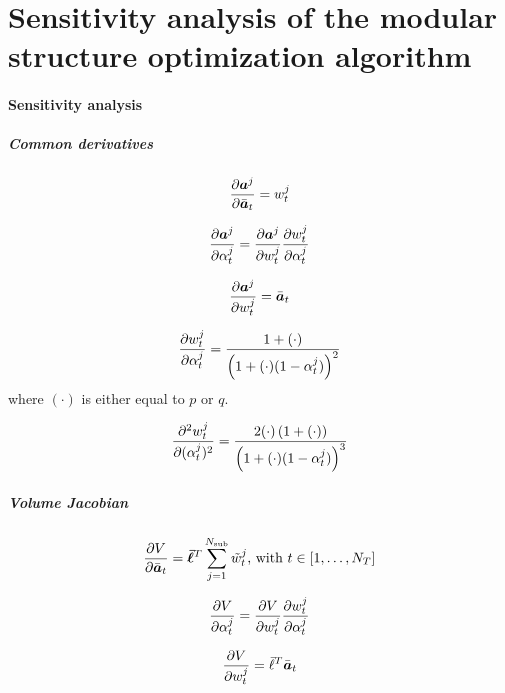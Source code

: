 \chapter{Sensitivity analysis of the modular structure optimization algorithm}
\subsubsection{Sensitivity analysis}
\paragraph*{Common derivatives}

\begin{equation}
    \frac{\partial\bm{a}^j}{\partial\bar{\bm{a}}_t} = w_t^j
\end{equation}


\begin{equation}
    \frac{\partial\bm{a}^j}{\partial\alpha_t^j} =  \frac{\partial\bm{a}^j}{\partial w_t^j} \frac{\partial w_t^j}{\partial\alpha_t^j}
\end{equation}

\begin{equation}
    \frac{\partial\bm{a}^j}{\partial w_t^j} = \bar{\bm{a}}_t
\end{equation}

\begin{equation}
    \frac{\partial w_t^j}{\partial\alpha_t^j} = \frac{1+(\cdot)}{\left(1+(\cdot)(1-\alpha_t^j)\right)^2}
\end{equation}
where $(\cdot)$ is either equal to $p$ or $q$.

\begin{equation}
    \frac{\partial^2w_t^j}{\partial(\alpha_t^j)^2} = \frac{2(\cdot)\left(1+(\cdot)\right)}{\left(1+(\cdot)(1-\alpha_t^j)\right)^3}
\end{equation}

\paragraph*{Volume Jacobian}
\begin{equation}
    \frac{\partial V}{\partial{\bar{\bm{a}}_t}} = \bm{\bar{\ell}}^T\sum_{j=1}^{N_{\text{sub}}} \tilde{w}_t^j  \text{, with } t \in [1,\dots,N_T]
\end{equation}

\begin{equation}
    \frac{\partial V}{\partial\alpha_t^j}= \frac{\partial V}{\partial w_t^j} \frac{\partial w_t^j}{\partial\alpha_t^j}
\end{equation}

\begin{equation}
    \frac{\partial V}{\partial w_t^j} = \bar{\ell}^T \bar{\bm{a}}_t
\end{equation}

